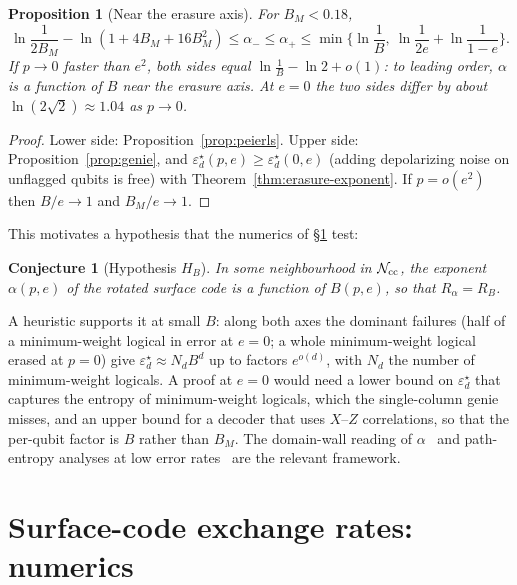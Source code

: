 \documentclass[11pt,a4paper]{article}
\theoremstyle{plain}
\newtheorem{proposition}[theorem]{Proposition}
\newtheorem{conjecture}[theorem]{Conjecture}
\theoremstyle{definition}
\theoremstyle{remark}
\newcommand{\err}{\varepsilon^{\star}}
\newcommand{\Ncc}{\mathcal{N}_{\rm cc}}
\begin{document}
\begin{proposition}[Near the erasure axis]\label{prop:hb-status}
For $B_M<0.18$,
\[
\ln\frac1{2B_M}-\ln(1+4B_M+16B_M^2)\le\alpha_-\le\alpha_+\le\min\Big\{\ln\frac1B,\ \ln\frac1{2e}+\ln\frac1{1-e}\Big\}.
\]
If $p\to0$ faster than $e^2$, both sides equal $\ln\frac1B-\ln2+o(1)$: to leading order, $\alpha$ is a function of $B$ near the erasure axis. At $e=0$ the two sides differ by about $\ln(2\sqrt2)\approx1.04$ as $p\to0$.
\end{proposition}
\begin{proof}
Lower side: Proposition~\ref{prop:peierls}. Upper side: Proposition~\ref{prop:genie}, and $\err_d(p,e)\ge\err_d(0,e)$ (adding depolarizing noise on unflagged qubits is free) with Theorem~\ref{thm:erasure-exponent}. If $p=o(e^2)$ then $B/e\to1$ and $B_M/e\to1$.
\end{proof}

\noindent This motivates a hypothesis that the numerics of \S\ref{sec:numerics} test:

\begin{conjecture}[Hypothesis $H_B$]\label{conj:HB}
In some neighbourhood in $\Ncc$, the exponent $\alpha(p,e)$ of the rotated surface code is a function of $B(p,e)$, so that $R_\alpha=R_B$.
\end{conjecture}

\noindent A heuristic supports it at small $B$: along both axes the dominant failures (half of a minimum-weight logical in error at $e=0$; a whole minimum-weight logical erased at $p=0$) give $\err_d\approx N_dB^d$ up to factors $e^{o(d)}$, with $N_d$ the number of minimum-weight logicals. A proof at $e=0$ would need a lower bound on $\err_d$ that captures the entropy of minimum-weight logicals, which the single-column genie misses, and an upper bound for a decoder that uses $X$--$Z$ correlations, so that the per-qubit factor is $B$ rather than $B_M$. The domain-wall reading of $\alpha$~\cite{DKLP,CF} and path-entropy analyses at low error rates~\cite{WatsonBarrett,BBKM,English} are the relevant framework.

\section{Surface-code exchange rates: numerics}\label{sec:numerics}
\end{document}
